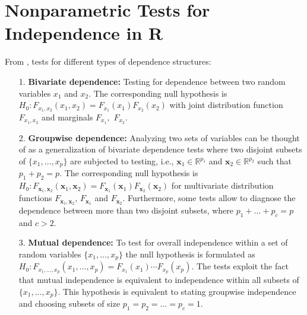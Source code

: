 \documentclass[11pt]{article}
\begin{document}
	\section*{Nonparametric Tests for Independence in R}
	From \cite{HerMax18}, tests for different types of dependence structures:
	\begin{itemize}
		\item[1.] {\bf Bivariate dependence:} Testing for dependence between two random variables $x_1$ and $x_2$. The corresponding null hypothesis is $H_0: F_{x_1,x_2}(x_1,x_2)=F_{x_1}(x_1)F_{x_2}(x_2)$ with joint distribution function $F_{x_1,x_2}$ and marginals $F_{x_1},$ $F_{x_2}.$ 
		\item[2.]{\bf Groupwise dependence:} Analyzing two sets of variables can be thought of as a generalization of bivariate dependence tests where two disjoint subsets of $\{x_1,\ldots,x_p\}$ are subjected to testing, i.e., $\bm{x}_1\in\mathbb{R}^{p_1}$ and $\bm{x}_2\in\mathbb{R}^{p_2}$ such that $p_1+p_2=p$. The corresponding null hypothesis is $H_0: F_{\bm{x}_1,\bm{x}_2}(\bm{x}_1,\bm{x}_2)=F_{\bm{x}_1}(\bm{x}_1)F_{\bm{x}_2}(\bm{x}_2)$ for multivariate distribution functions $F_{\bm{x}_1,\bm{x}_2},\, F_{\bm{x}_1}$ and $F_{\bm{x}_2}$. Furthermore, some tests allow to diagnose the dependence between more than two disjoint subsets, where $p_1+\ldots+p_c=p$ and $c>2.$ 
		\item[3.]{\bf Mutual dependence:} To test for overall independence within a set of random variables $\{x_1,\ldots,x_p\}$ the null hypothesis is formulated as $H_0: F_{x_1,\ldots,x_p}(x_1,\ldots,x_p)=F_{x_1}(x_1)\cdots F_{x_p}(x_p).$ The tests exploit the fact that mutual independence is equivalent to independence within all subsets of $\{x_1,\ldots,x_p\}$. This hypothesis is equivalent to stating groupwise independence and choosing subsets of size $p_1=p_2=\ldots=p_c=1$. 
	\end{itemize}
	
	
	
\end{document}
